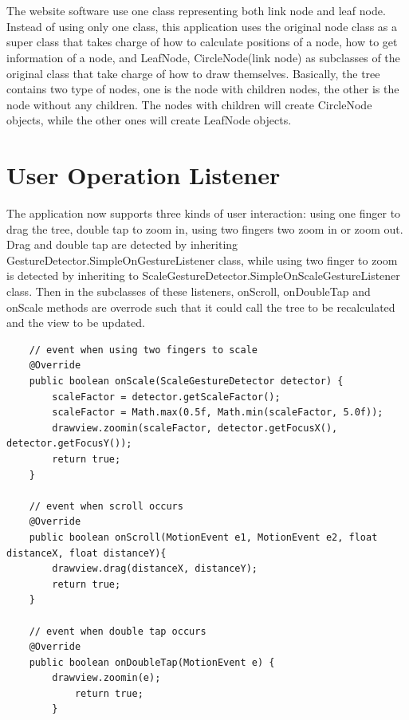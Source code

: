 \documentclass[MSc]{icldt}
\begin{document}
\section{ }


The website software use one class representing both link node and leaf node. Instead of using only one class, this application uses the original node class as a super class that takes charge of how to calculate positions of a node, how to get information of a node, and LeafNode, CircleNode(link node) as subclasses of the original class that take charge of how to draw themselves. Basically, the tree contains two type of nodes, one is the node with children nodes, the other is the node without any children. The nodes with children will create CircleNode objects, while the other ones will create LeafNode objects. 

\section{User Operation Listener}

The application now supports three kinds of user interaction: using one finger to drag the tree, double tap to zoom in, using two fingers two zoom in or zoom out. Drag and double tap are detected by inheriting GestureDetector.SimpleOnGestureListener class, while using two finger to zoom is detected by inheriting to ScaleGestureDetector.SimpleOnScaleGestureListener class. Then in the subclasses of these listeners, onScroll, onDoubleTap and onScale methods are overrode such that it could call the tree to be recalculated and the view to be updated. 

\begin{lstlisting}
	// event when using two fingers to scale
	@Override
	public boolean onScale(ScaleGestureDetector detector) {
		scaleFactor = detector.getScaleFactor();
		scaleFactor = Math.max(0.5f, Math.min(scaleFactor, 5.0f));
		drawview.zoomin(scaleFactor, detector.getFocusX(), detector.getFocusY());
		return true;
	}
	
	// event when scroll occurs
	@Override
	public boolean onScroll(MotionEvent e1, MotionEvent e2, float distanceX, float distanceY){
		drawview.drag(distanceX, distanceY);
		return true;
	}
	
	// event when double tap occurs    
	@Override
	public boolean onDoubleTap(MotionEvent e) {
		drawview.zoomin(e);
    		return true;
        }

\end{lstlisting}
\end{document}
